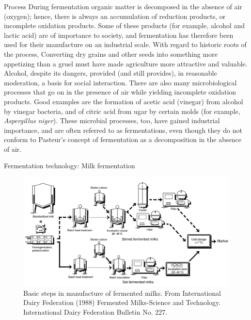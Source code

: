 \documentclass[
  ignorenonframetext,
  aspectratio=169]{beamer}
\begin{document}
\begin{frame}{Process}
\protect\hypertarget{process}{}
During fermentation organic matter is decomposed in the absence of air
(oxygen); hence, there is always an accumulation of reduction products,
or incomplete oxidation products. Some of these products (for example,
alcohol and lactic acid) are of importance to society, and fermentation
has therefore been used for their manufacture on an industrial scale.
With regard to historic roots of the process, Converting dry grains and
other seeds into something more appetizing than a gruel must have made
agriculture more attractive and valuable. Alcohol, despite its dangers,
provided (and still provides), in reasonable moderation, a basis for
social interaction. There are also many microbiological processes that
go on in the presence of air while yielding incomplete oxidation
products. Good examples are the formation of acetic acid (vinegar) from
alcohol by vinegar bacteria, and of citric acid from ugar by certain
molds (for example, \emph{Aspergillus niger}). These microbial
processes, too, have gained industrial importance, and are often
referred to as fermentations, even though they do not conform to
Pasteur's concept of fermentation as a decomposition in the absence of
air.
\end{frame}

\begin{frame}{Fermentation technology: Milk fermentation}
\protect\hypertarget{fermentation-technology-milk-fermentation}{}
\begin{figure}
\includegraphics[width=0.62\linewidth]{../images/milk_fermentation} \caption{Basic steps in manufacture of fermented milks. From International Dairy Federation (1988) Fermented Milks-Science and Technology. International Dairy Federation Bulletin No. 227.}\label{fig:milk-fermentation-steps}
\end{figure}
\end{frame}
\end{document}
